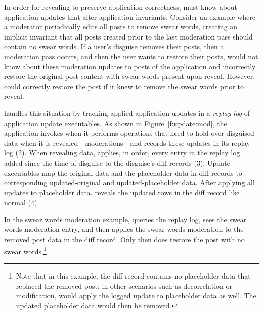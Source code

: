 In order for revealing to preserve application correctness, \sys must know about
application updates that alter application invariants.
%
Consider an example where a moderator periodically edits all posts to remove
swear words, creating an implicit invariant that all posts created prior to the
last moderation pass should contain no swear words.
%
If a user's disguise removes their posts, then a moderation pass occurs, and
then the user wants to restore their posts, \sys would not know about these
moderation updates to posts of the application and incorrectly restore the
original post content with swear words present upon reveal.
%
However, \sys could correctly restore the post if it knew to remove the swear
words prior to reveal.
%
%
%

\sys handles this situation by tracking applied application updates in a
\emph{replay log} of application update executables.
%
As shown in Figure~\ref{f:update:mod}, the application invokes \sys when it
performs operations that need to hold over disguised data when it is
revealed---\eg moderations---and \sys records these updates in its replay log
(2).
%
When revealing data, \sys applies, in order, every entry in the replay log
added since the time of disguise to the disguise's diff records (3).  
%
Update executables map the original data and the placeholder data in diff records
to corresponding updated-original and updated-placeholder data. 
%
After applying all updates to placeholder data, \sys reveals the updated rows in
the diff record like normal (4).
%
%

%
In the swear words moderation example, \sys queries the replay log, sees
the swear words moderation entry, and then applies the swear words moderation to
the removed post data in the diff record. Only then does \sys restore the post
with no swear words.\footnote{Note that in this example, the diff
record contains no placeholder data that replaced the removed post; in other
scenarios such as decorrelation or modification, \sys would apply the logged
update to placeholder data as well. The updated placeholder data would then be
removed.}


